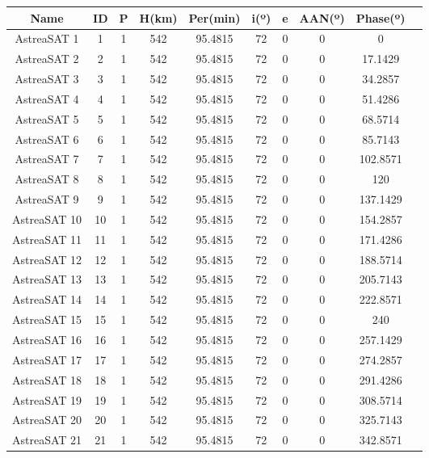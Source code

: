 \begin{longtable}{| c | c | c | c | c | c | c | c | c | c |}
	\hline	
	\rowcolor[gray]{0.80}
	\textbf{Name}& \textbf{ID}& \textbf{P}& \textbf{H(km)}& \textbf{Per(min)}& \textbf{i(º)}& \textbf{e}&
	\textbf{AAN(º)}&\textbf{Phase(º)}\\
	\hline
	\hline
	\endfirsthead

AstreaSAT 1 & 1 & 1 & 542 & 95.4815 & 72 & 0 & 0 & 0 \\ 
AstreaSAT 2 & 2 & 1 & 542 & 95.4815 & 72 & 0 & 0 & 17.1429 \\ 
AstreaSAT 3 & 3 & 1 & 542 & 95.4815 & 72 & 0 & 0 & 34.2857 \\ 
AstreaSAT 4 & 4 & 1 & 542 & 95.4815 & 72 & 0 & 0 & 51.4286 \\
AstreaSAT 5 & 5 & 1 & 542 & 95.4815 & 72 & 0 & 0 & 68.5714 \\
AstreaSAT 6 & 6 & 1 & 542 & 95.4815 & 72 & 0 & 0 & 85.7143 \\
AstreaSAT 7 & 7 & 1 & 542 & 95.4815 & 72 & 0 & 0 & 102.8571 \\ 
AstreaSAT 8 & 8 & 1 & 542 & 95.4815 & 72 & 0 & 0 & 120 \\
AstreaSAT 9 & 9 & 1 & 542 & 95.4815 & 72 & 0 & 0 & 137.1429 \\ 
AstreaSAT 10 & 10 & 1 & 542 & 95.4815 & 72 & 0 & 0 & 154.2857 \\ 
AstreaSAT 11 & 11 & 1 & 542 & 95.4815 & 72 & 0 & 0 & 171.4286 \\ 
AstreaSAT 12 & 12 & 1 & 542 & 95.4815 & 72 & 0 & 0 & 188.5714 \\
AstreaSAT 13 & 13 & 1 & 542 & 95.4815 & 72 & 0 & 0 & 205.7143 \\
AstreaSAT 14 & 14 & 1 & 542 & 95.4815 & 72 & 0 & 0 & 222.8571 \\
AstreaSAT 15 & 15 & 1 & 542 & 95.4815 & 72 & 0 & 0 & 240 \\
AstreaSAT 16 & 16 & 1 & 542 & 95.4815 & 72 & 0 & 0 & 257.1429 \\ 
AstreaSAT 17 & 17 & 1 & 542 & 95.4815 & 72 & 0 & 0 & 274.2857 \\
AstreaSAT 18 & 18 & 1 & 542 & 95.4815 & 72 & 0 & 0 & 291.4286 \\
AstreaSAT 19 & 19 & 1 & 542 & 95.4815 & 72 & 0 & 0 & 308.5714 \\
AstreaSAT 20 & 20 & 1 & 542 & 95.4815 & 72 & 0 & 0 & 325.7143 \\
AstreaSAT 21 & 21 & 1 & 542 & 95.4815 & 72 & 0 & 0 & 342.8571 \\

\end{longtable}
